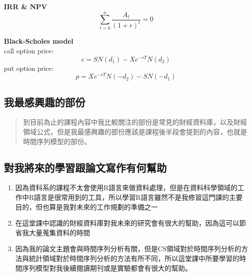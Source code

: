\documentclass[
]{article}
\providecommand{\tightlist}{%
  \setlength{\itemsep}{0pt}\setlength{\parskip}{0pt}}
\begin{document}
\textbf{IRR \& NPV} \[\sum_{t=0}^n{\frac{A_t}{(1+r)^t}}=0\]

\textbf{Black-Scholes model}\\
call option price: \[c=SN(d_1)-Xe^{-rT}N(d_2)\] put option price:
\[p=Xe^{-rT}N(-d_2)-SN(-d_1)\]

\hypertarget{ux6211ux6700ux611fux8208ux8da3ux7684ux90e8ux4efd}{%
\subsection{我最感興趣的部份}\label{ux6211ux6700ux611fux8208ux8da3ux7684ux90e8ux4efd}}

\begin{quote}
到目前為止的課程內容中我比較關注的部份是常見的財經資料庫，以及財經領域公式，但是我最感興趣的部份應該是課程後半段會提到的內容，也就是時間序列模型的部份。
\end{quote}

\hypertarget{ux5c0dux6211ux5c07ux4f86ux7684ux5b78ux7fd2ux8ddfux8ad6ux6587ux5bebux4f5cux6709ux4f55ux5e6bux52a9}{%
\subsection{對我將來的學習跟論文寫作有何幫助}\label{ux5c0dux6211ux5c07ux4f86ux7684ux5b78ux7fd2ux8ddfux8ad6ux6587ux5bebux4f5cux6709ux4f55ux5e6bux52a9}}

\begin{enumerate}
\def\labelenumi{\arabic{enumi}.}
\tightlist
\item
  因為資科系的課程不太會使用R語言來做資料處理，但是在資料科學領域的工作中R語言是很常用到的工具，所以學習R語言雖然不是我修習這門課的主要目的，但也算是我對未來的工作規劃的準備之一
\item
  在這堂課中認識的財經資料庫對我未來的研究會有很大的幫助，因為這可以節省我大量蒐集資料的時間
\item
  因為我的論文主題會與時間序列分析有關，但是CS領域對於時間序列分析的方法與統計領域對於時間序列分析的方法有所不同，所以這堂課中所要學習的時間序列模型對我後續閱讀期刊或是實驗都會有很大的幫助。
\end{enumerate}
\end{document}
